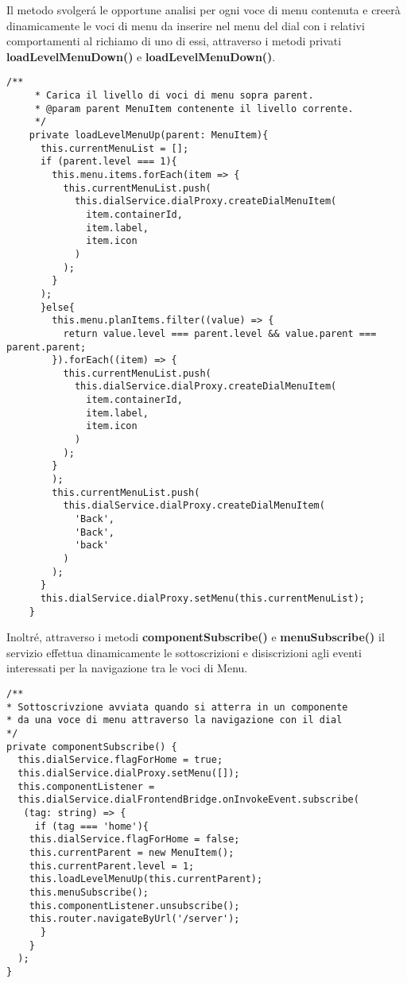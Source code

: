 Il metodo svolgerá le opportune analisi per ogni voce di menu contenuta e creerà dinamicamente le voci di menu da inserire nel menu del dial con i relativi comportamenti al richiamo di uno di essi, attraverso i metodi privati \textbf{loadLevelMenuDown()} e \textbf{loadLevelMenuDown()}.\\

\vspace{1.0cm}
\begin{lstlisting}[caption={Metodo loadLevelMenuUp},style=javaScriptCode]
    /**
     * Carica il livello di voci di menu sopra parent.
     * @param parent MenuItem contenente il livello corrente.
     */
    private loadLevelMenuUp(parent: MenuItem){
      this.currentMenuList = [];
      if (parent.level === 1){
        this.menu.items.forEach(item => {
          this.currentMenuList.push(
            this.dialService.dialProxy.createDialMenuItem(
              item.containerId, 
              item.label, 
              item.icon
            )
          );
        }
      );
      }else{
        this.menu.planItems.filter((value) => {
          return value.level === parent.level && value.parent === parent.parent;
        }).forEach((item) => {
          this.currentMenuList.push(
            this.dialService.dialProxy.createDialMenuItem(
              item.containerId, 
              item.label, 
              item.icon
            )
          );
        }
        );
        this.currentMenuList.push(
          this.dialService.dialProxy.createDialMenuItem(
            'Back', 
            'Back', 
            'back'
          )
        );
      }
      this.dialService.dialProxy.setMenu(this.currentMenuList);
    }
\end{lstlisting} 
\vspace{1.0cm}

Inoltré, attraverso i metodi \textbf{componentSubscribe()} e \textbf{menuSubscribe()} il servizio effettua dinamicamente le sottoscrizioni e disiscrizioni agli eventi interessati per la navigazione tra le voci di Menu.


\vspace{1.0cm}
\begin{lstlisting}[caption={Metodo componentSubscribe},style=javaScriptCode]
/**
* Sottoscrivzione avviata quando si atterra in un componente 
* da una voce di menu attraverso la navigazione con il dial
*/
private componentSubscribe() {
  this.dialService.flagForHome = true;
  this.dialService.dialProxy.setMenu([]);
  this.componentListener = 
  this.dialService.dialFrontendBridge.onInvokeEvent.subscribe(
   (tag: string) => {
     if (tag === 'home'){
	this.dialService.flagForHome = false;
	this.currentParent = new MenuItem();
	this.currentParent.level = 1;
	this.loadLevelMenuUp(this.currentParent);
	this.menuSubscribe();
	this.componentListener.unsubscribe();
	this.router.navigateByUrl('/server');
      }
    }
  );
}
\end{lstlisting} 
\vspace{1.0cm}

